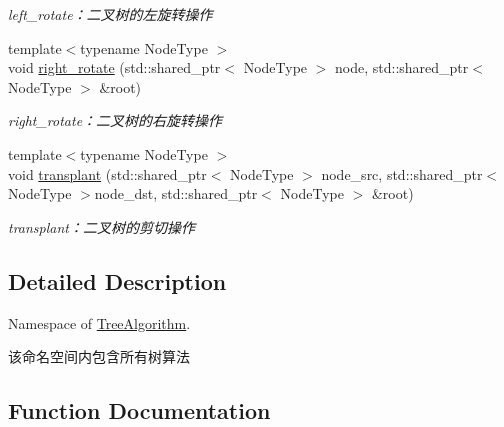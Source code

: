 \begin{DoxyCompactItemize}
\begin{DoxyCompactList}\small\item\em left\+\_\+rotate：二叉树的左旋转操作 \end{DoxyCompactList}\item 
{\footnotesize template$<$typename Node\+Type $>$ }\\void \hyperlink{namespace_introduction_to_algorithm_1_1_tree_algorithm_adeb83a10f8daa65c5cf5921737a04da0}{right\+\_\+rotate} (std\+::shared\+\_\+ptr$<$ Node\+Type $>$ node, std\+::shared\+\_\+ptr$<$ Node\+Type $>$ \&root)
\begin{DoxyCompactList}\small\item\em right\+\_\+rotate：二叉树的右旋转操作 \end{DoxyCompactList}\item 
{\footnotesize template$<$typename Node\+Type $>$ }\\void \hyperlink{namespace_introduction_to_algorithm_1_1_tree_algorithm_a4fb6d9c7d8b75a8d6ec4ee79fc0b1de5}{transplant} (std\+::shared\+\_\+ptr$<$ Node\+Type $>$ node\+\_\+src, std\+::shared\+\_\+ptr$<$ Node\+Type $>$node\+\_\+dst, std\+::shared\+\_\+ptr$<$ Node\+Type $>$ \&root)
\begin{DoxyCompactList}\small\item\em transplant：二叉树的剪切操作 \end{DoxyCompactList}\end{DoxyCompactItemize}


\subsection{Detailed Description}
Namespace of \hyperlink{namespace_introduction_to_algorithm_1_1_tree_algorithm}{Tree\+Algorithm}. 

该命名空间内包含所有树算法 

\subsection{Function Documentation}
\hypertarget{namespace_introduction_to_algorithm_1_1_tree_algorithm_aff9afe8e77b1aaaa5715b270fecd73c4}{}
